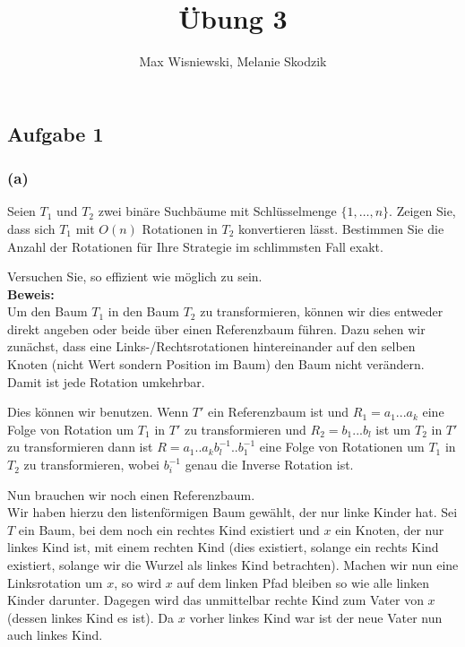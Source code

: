 \documentclass[11pt,a4paper,ngerman]{article}
\date{}
\title{Übung 3}
\author{Max Wisniewski, Melanie Skodzik}
\begin{document}

\renewcommand{\figurename}{Grafik}

\maketitle
\thispagestyle{fancy}


\subsection*{Aufgabe 1}

\subsubsection*{(a)}
Seien $T_1$ und $T_2$ zwei binäre Suchbäume mit Schlüsselmenge $\{1, \ldots, n\}$. Zeigen Sie, dass sich $T_1$ mit $O(n)$ Rotationen in $T_2$ konvertieren lässt. Bestimmen Sie die Anzahl der Rotationen für Ihre Strategie im schlimmsten Fall exakt.

Versuchen Sie, so effizient wie möglich zu sein.\\

\noindent\textbf{Beweis:}\\

Um den Baum $T_1$ in den Baum $T_2$ zu transformieren, können wir dies entweder direkt angeben oder beide über einen Referenzbaum führen. Dazu sehen wir zunächst, dass eine Links-/Rechtsrotationen hintereinander auf den selben Knoten (nicht Wert sondern Position im Baum) den Baum nicht verändern. Damit ist jede Rotation umkehrbar.

Dies können wir benutzen. Wenn $T'$ ein Referenzbaum ist und $R_1 = a_1 ... a_k$ eine Folge von Rotation um $T_1$ in $T'$ zu transformieren und
$R_2 = b_1 ... b_l$ ist um $T_2$ in $T'$ zu transformieren dann ist $R = a_1 .. a_k b_l^{-1} .. b_1^{-1}$ eine Folge von Rotationen um $T_1$ in $T_2$ zu transformieren,
wobei $b_i^{-1}$ genau die Inverse Rotation ist.

Nun brauchen wir noch einen Referenzbaum.\\

Wir haben hierzu den listenförmigen Baum gewählt, der nur linke Kinder hat. Sei $T$ ein Baum, bei dem noch ein rechtes Kind existiert und $x$ ein Knoten, der nur linkes Kind ist, mit einem rechten Kind (dies existiert, solange ein rechts Kind existiert, solange wir die Wurzel als linkes Kind betrachten). Machen wir nun eine Linksrotation um $x$,
so wird $x$ auf dem linken Pfad bleiben so wie alle linken Kinder darunter. Dagegen wird das unmittelbar rechte Kind zum Vater von $x$ (dessen linkes Kind es ist). Da $x$ vorher linkes Kind war ist der neue Vater nun auch linkes Kind.\\
\end{document}
